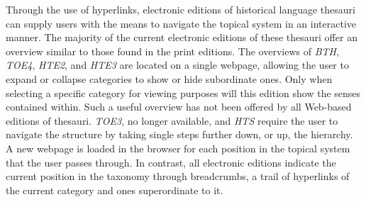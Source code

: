 Through the use of hyperlinks, electronic editions of historical language thesauri can supply users with the means to navigate the topical system in an interactive manner. The majority of the current electronic editions of these thesauri 
offer an overview %
similar to those found in the print editions. The overviews of \textit{BTH}, \textit{TOE4}, \textit{HTE2}, and \textit{HTE3} are located on a single webpage, allowing the user to expand or collapse categories to show or hide subordinate ones. Only when selecting a specific category for viewing purposes will this edition show the senses contained within. Such a useful overview has not been offered by all Web-based editions of thesauri.  \textit{TOE3}, no longer available, and \textit{HTS} require the user to navigate the structure by taking single steps further down, or up, the hierarchy. A new webpage is loaded in the browser for each position in the topical system that the user passes through. In contrast, all electronic editions indicate the current position in the taxonomy through breadcrumbs, a trail of hyperlinks of the current category and ones superordinate to it. %


